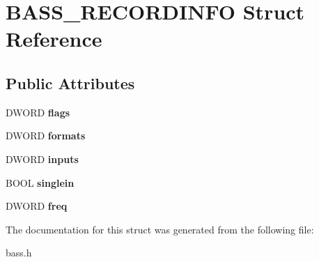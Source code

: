 \section{B\+A\+S\+S\+\_\+\+R\+E\+C\+O\+R\+D\+I\+N\+F\+O Struct Reference}
\label{struct_b_a_s_s___r_e_c_o_r_d_i_n_f_o}
\subsection*{Public Attributes}
\begin{DoxyCompactItemize}
\item 
D\+W\+O\+R\+D {\bfseries flags}\label{struct_b_a_s_s___r_e_c_o_r_d_i_n_f_o_a97ae96c797ff1c981b459506629bad9c}

\item 
D\+W\+O\+R\+D {\bfseries formats}\label{struct_b_a_s_s___r_e_c_o_r_d_i_n_f_o_aedfae3cd5f0d09c239eda38ed3ef9c2b}

\item 
D\+W\+O\+R\+D {\bfseries inputs}\label{struct_b_a_s_s___r_e_c_o_r_d_i_n_f_o_a7b049b2bd7f57b9f8fba6f01c0106589}

\item 
B\+O\+O\+L {\bfseries singlein}\label{struct_b_a_s_s___r_e_c_o_r_d_i_n_f_o_a5a18b145e6f2bf4670cc815cea5744ec}

\item 
D\+W\+O\+R\+D {\bfseries freq}\label{struct_b_a_s_s___r_e_c_o_r_d_i_n_f_o_af643ddd16623da7b0370ab191d8bb204}

\end{DoxyCompactItemize}


The documentation for this struct was generated from the following file\+:\begin{DoxyCompactItemize}
\item 
bass.\+h\end{DoxyCompactItemize}
